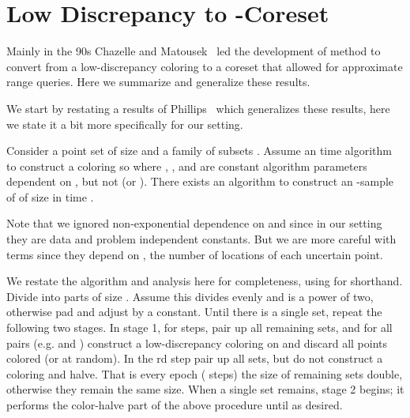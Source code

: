 \documentclass[11pt]{myclass}
\begin{document}
 


\appendix
\section{Low Discrepancy to -Coreset}
\label{app:MR}

Mainly in the 90s Chazelle and Matousek~\cite{CW89,CM96,divide,Mat99,Cha01} led the development of method to convert from a low-discrepancy coloring to a coreset that allowed for approximate range queries.  Here we summarize and generalize these results.  


We start by restating a results of Phillips~\cite{Phi08,Phi09} which generalizes these results, here we state it a bit more specifically for our setting.  

\begin{theorem}
Consider a point set  of size  and a family of subsets .
Assume an  time algorithm to construct a coloring  so  where , , and  are constant algorithm parameters dependent on , but not  (or ).  
There exists an algorithm to construct an -sample of  of size  in time 
.  
\label{thm:disc2samp}
\end{theorem}

Note that we ignored non-exponential dependence on  and  since in our setting they are data and problem independent constants.  But we are more careful with  terms since they depend on , the number of locations of each uncertain point.  

We restate the algorithm and analysis here for completeness, using  for shorthand.  
Divide  into  parts  of size .  Assume this divides evenly and  is a power of two, otherwise pad  and adjust  by a constant.  
Until there is a single set, repeat the following two stages.  
In stage 1, for  steps, pair up all remaining sets, and for all pairs (e.g.  and ) construct a low-discrepancy coloring  on  and discard all points colored  (or  at random).  In the rd step pair up all sets, but do not construct a coloring and halve.  
That is every epoch ( steps) the size of remaining sets double, otherwise they remain the same size.  
When a single set remains, stage 2 begins; it performs the color-halve part of the above procedure until  as desired.  
\end{document}
